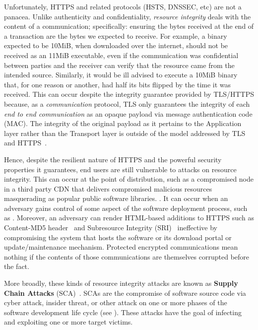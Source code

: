Unfortunately, HTTPS and related protocols (HSTS, DNSSEC, etc) are not a
panacea. Unlike authenticity and confidentiality, \textit{resource integrity}
deals with the content of a communication; specifically: ensuring the bytes
received at the end of a transaction are the bytes we expected to receive. For
example, a binary expected to be 10MiB, when downloaded over the internet,
should not be received as an 11MiB executable, even if the communication was
confidential between parties and the receiver can verify that the resource came
from the intended source. Similarly, it would be ill advised to execute a 10MiB
binary that, for one reason or another, had half its bits flipped by the time it
was received. This can occur despite the integrity guarantee provided by
TLS/HTTPS because, as a \textit{communication} protocol, TLS only guarantees the
integrity of each \textit{end to end communication} as an opaque payload via
message authentication code (MAC). The integrity of the original payload as it
pertains to the Application layer rather than the Transport layer is outside of
the model addressed by TLS and HTTPS~\cite{TLS1.2, HTTPS}.  

Hence, despite the resilient nature of HTTPS and the powerful security
properties it guarantees, end users are still vulnerable to attacks on resource
integrity. This can occur at the point of distribution, such as a compromised
node in a third party CDN that delivers compromised malicious resources
masquerading as popular public software libraries. . It can occur when an adversary gains control of some
aspect of the software deployment process, such as . Moreover, an adversary can render HTML-based additions to HTTPS
such as Content-MD5 header~\cite{MD5Header} and Subresource Integrity
(SRI)~\cite{SRI} ineffective by compromising the system that hosts the software
or its download portal or update/maintenance mechanism. Protected encrypted
communications mean nothing if the contents of those communications are
themselves corrupted before the fact.

More broadly, these kinds of resource integrity attacks are known as
\textbf{Supply Chain Attacks} (SCA)~\cite{}. SCAs are the compromise of software
source code via cyber attack, insider threat, or other attack on one or more
phases of the software development life cycle (see ). These
attacks have the goal of infecting and exploiting one or more target victims.

